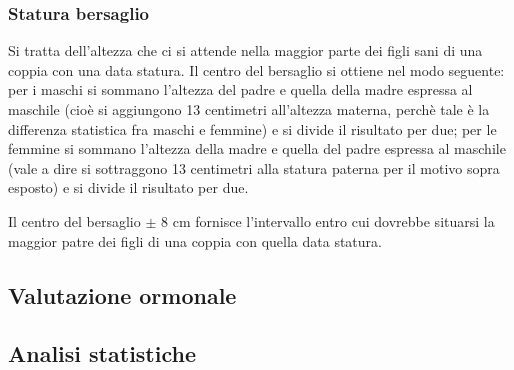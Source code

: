 \subsubsection*{Statura bersaglio}
Si tratta dell'altezza che ci si attende nella maggior parte dei figli sani di una coppia con una data statura. Il centro del bersaglio si ottiene nel modo seguente: per i maschi si sommano l'altezza del padre e quella della madre espressa al maschile (cioè si aggiungono 13 centimetri all'altezza materna, perchè tale è la differenza statistica fra maschi e femmine) e si divide il risultato per due; per le femmine si sommano l'altezza della madre e quella del padre espressa al maschile (vale a dire si sottraggono 13 centimetri alla statura paterna per il motivo sopra esposto) e si divide il risultato per due. 

Il centro del bersaglio $\pm$ 8 cm fornisce l'intervallo entro cui dovrebbe situarsi la maggior patre dei figli di una coppia con quella data statura.





\clearpage

\subsection{Valutazione ormonale}

\subsection{Analisi statistiche}
